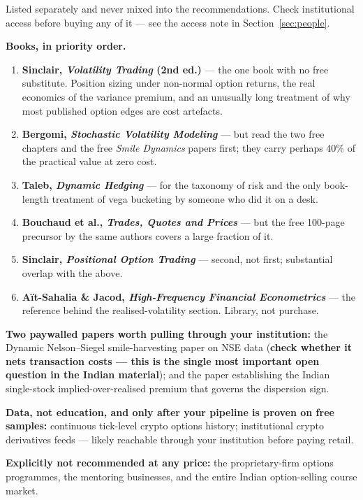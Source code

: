 \documentclass[11pt,a4paper]{article}
\begin{document}
Listed separately and never mixed into the recommendations. Check institutional
access before buying any of it --- see the access note in Section~\ref{sec:people}.

\textbf{Books, in priority order.}
\begin{enumerate}
\item \textbf{Sinclair, \emph{Volatility Trading} (2nd ed.)} --- the one book with
no free substitute. Position sizing under non-normal option returns, the real
economics of the variance premium, and an unusually long treatment of why most
published option edges are cost artefacts.
\item \textbf{Bergomi, \emph{Stochastic Volatility Modeling}} --- but read the two
free chapters and the free \emph{Smile Dynamics} papers first; they carry perhaps
40\% of the practical value at zero cost.
\item \textbf{Taleb, \emph{Dynamic Hedging}} --- for the taxonomy of risk and the
only book-length treatment of vega bucketing by someone who did it on a desk.
\item \textbf{Bouchaud et al., \emph{Trades, Quotes and Prices}} --- but the free
100-page precursor by the same authors covers a large fraction of it.
\item \textbf{Sinclair, \emph{Positional Option Trading}} --- second, not first;
substantial overlap with the above.
\item \textbf{A\"it-Sahalia \& Jacod, \emph{High-Frequency Financial Econometrics}}
--- the reference behind the realised-volatility section. Library, not purchase.
\end{enumerate}

\textbf{Two paywalled papers worth pulling through your institution:}
the Dynamic Nelson--Siegel smile-harvesting paper on NSE data (\textbf{check
whether it nets transaction costs --- this is the single most important open
question in the Indian material}); and the paper establishing the Indian
single-stock implied-over-realised premium that governs the dispersion sign.

\textbf{Data, not education, and only after your pipeline is proven on free
samples:} continuous tick-level crypto options history; institutional crypto
derivatives feeds --- likely reachable through your institution before paying retail.

\textbf{Explicitly not recommended at any price:} the proprietary-firm options
programmes, the mentoring businesses, and the entire Indian option-selling course
market.
\end{document}
